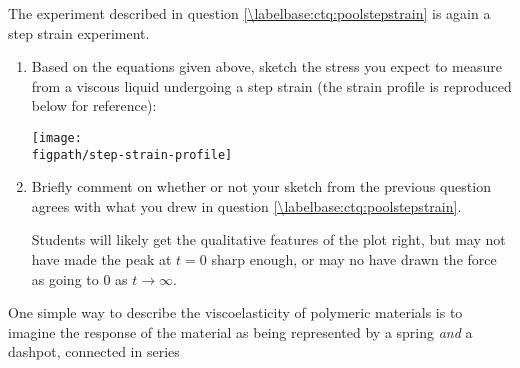 \begin{activity}
\begin{infobox}
\end{infobox}

\clearpage
\begin{ctqs}

	\question The experiment described in question \ref{\labelbase:ctq:poolstepstrain} is again a step strain experiment.
	
		\begin{enumerate}
			\item Based on the equations given above, sketch the stress you expect to measure from a viscous liquid undergoing a step strain (the strain profile is reproduced below for reference):
			
				\begin{solution}[3.5in]
					\vspace{6pt}
					\centerline{\texttt{[image: \\figpath/step-strain-profile]}}
					\vspace{6pt}
				\end{solution}
				
			\item Briefly comment on whether or not your sketch from the previous question agrees with what you drew in question \ref{\labelbase:ctq:poolstepstrain}.
			
				\begin{solution}[1in]
					Students will likely get the qualitative features of the plot right, but may not have made the peak at $t=0$ sharp enough, or may no have drawn the force as going to $0$ as $t\to\infty$.
				\end{solution}
		\end{enumerate}
\end{ctqs}
	
\clearpage
\begin{model}
\label{\labelbase:mdl:maxwell}

	One simple way to describe the viscoelasticity of polymeric materials is to imagine the response of the material as being represented by a spring \emph{and} a dashpot, connected in series
	

\end{model}
\end{activity}
